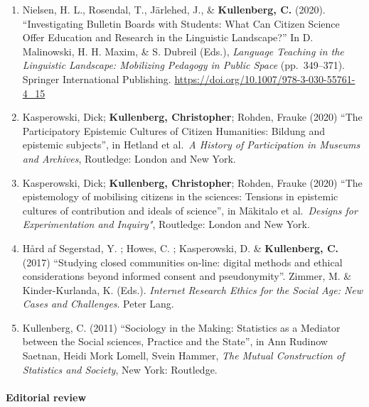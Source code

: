 \documentclass[
]{article}
\providecommand{\tightlist}{%
  \setlength{\itemsep}{0pt}\setlength{\parskip}{0pt}}
\begin{document}
\begin{enumerate}
\def\labelenumi{\arabic{enumi}.}
\tightlist
\item
  Nielsen, H. L., Rosendal, T., Järlehed, J., \& \textbf{Kullenberg, C.}
  (2020). ``Investigating Bulletin Boards with Students: What Can
  Citizen Science Offer Education and Research in the Linguistic
  Landscape?'' In D. Malinowski, H. H. Maxim, \& S. Dubreil (Eds.),
  \emph{Language Teaching in the Linguistic Landscape: Mobilizing
  Pedagogy in Public Space} (pp.~349--371). Springer International
  Publishing. \url{https://doi.org/10.1007/978-3-030-55761-4_15}
\item
  Kasperowski, Dick; \textbf{Kullenberg, Christopher}; Rohden, Frauke
  (2020) ``The Participatory Epistemic Cultures of Citizen Humanities:
  Bildung and epistemic subjects'', in Hetland et al.~\emph{A History of
  Participation in Museums and Archives}, Routledge: London and New
  York.
\item
  Kasperowski, Dick; \textbf{Kullenberg, Christopher}; Rohden, Frauke
  (2020) ``The epistemology of mobilising citizens in the sciences:
  Tensions in epistemic cultures of contribution and ideals of
  science'', in Mäkitalo et al.~\emph{Designs for Experimentation and
  Inquiry"}, Routledge: London and New York.
\item
  Hård af Segerstad, Y. ; Howes, C. ; Kasperowski, D. \&
  \textbf{Kullenberg, C.} (2017) ``Studying closed communities on-line:
  digital methods and ethical considerations beyond informed consent and
  pseudonymity''. Zimmer, M. \& Kinder-Kurlanda, K. (Eds.).
  \emph{Internet Research Ethics for the Social Age: New Cases and
  Challenges}. Peter Lang.
\item
  Kullenberg, C. (2011) ``Sociology in the Making: Statistics as a
  Mediator between the Social sciences, Practice and the State'', in Ann
  Rudinow Saetnan, Heidi Mork Lomell, Svein Hammer, \emph{The Mutual
  Construction of Statistics and Society}, New York: Routledge.
\end{enumerate}

\hypertarget{editorial-review}{%
\paragraph{Editorial review}\label{editorial-review}}
\end{document}
